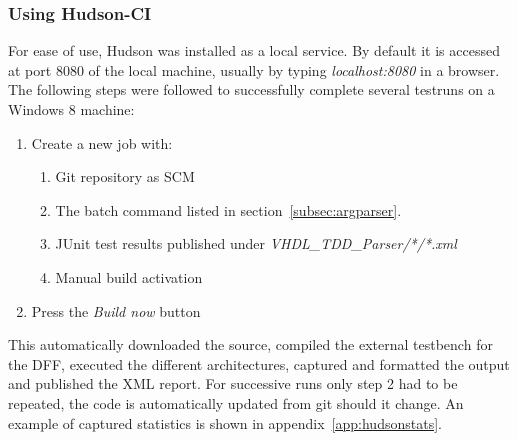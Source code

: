 \documentclass[11pt,british]{article}
\begin{document}
\subsubsection{Using Hudson-CI}
For ease of use, Hudson was installed as a local service. By default it is accessed at port 8080 of the local machine, usually by typing \emph{localhost:8080} in a browser. The following steps were followed to successfully complete several testruns on a Windows 8 machine:
\begin{enumerate}
\item Create a new job with:
\begin{enumerate}
\item Git repository as SCM
\item The batch command listed in section~\ref{subsec:argparser}.
\item JUnit test results published under \emph{VHDL\_TDD\_Parser/*/*.xml}
\item Manual build activation
\end{enumerate}
\item Press the \emph{Build now} button
\end{enumerate}
This automatically downloaded the source, compiled the external testbench for the \gls{DFF}, executed the different architectures, captured and formatted the output and published the \gls{XML} report. For successive runs only step 2 had to be repeated, the code is automatically updated from git should it change. An example of captured statistics is shown in appendix~\ref{app:hudsonstats}.
\end{document}

